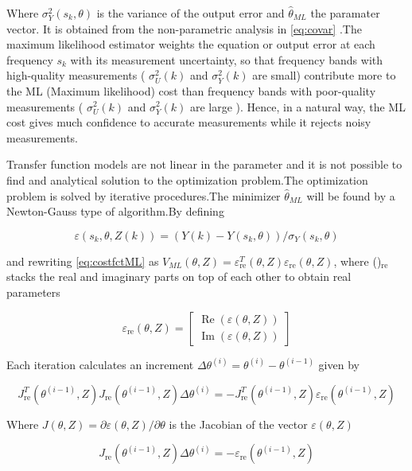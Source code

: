 \documentclass[a4paper,12pt]{article}
\numberwithin{equation}{section}
\begin{document}
\noindent
Where $\sigma_{Y}^{2}(s_{k}, \theta)$ is the variance of the output error and $\hat{\theta}_{ML}$ the paramater vector. It is obtained from the non-parametric analysis in \ref{eq:covar} .The maximum likelihood estimator weights the equation or output error at each frequency $s_{k}$ with its measurement uncertainty, so that frequency bands with high-quality
measurements ( $\sigma_{U}^{2}(k)$ and $\sigma_{Y}^{2}(k)$ are small) contribute more to the ML (Maximum likelihood) cost than frequency bands with poor-quality measurements ( $\sigma_{U}^{2}(k)$ and $\sigma_{Y}^{2}(k)$ are large ).  Hence, in a natural way, the ML cost gives much confidence to accurate measurements while it rejects noisy measurements.

Transfer function models are not linear in the parameter and it is not possible to find and analytical solution to the optimization problem.The optimization problem is solved by iterative procedures.The minimizer $\hat{\theta}_{ML}$ will be found by a Newton-Gauss type of algorithm.By defining 

$$
\varepsilon\left(s_{k}, \theta, Z(k)\right)=\left(Y(k)-Y\left(s_{k}, \theta\right)\right) / \sigma_{Y}\left(s_{k}, \theta\right)
$$

and rewriting \ref{eq:costfctML} as $V_{ML}(\theta, Z)=\varepsilon_{\mathrm{re}}^{T}(\theta, Z) \varepsilon_{\mathrm{re}}(\theta, Z)$, where ()$_{\mathrm{re}}$ stacks the real and imaginary
parts on top of each other to obtain real parameters

$$
\varepsilon_{\mathrm{re}}(\theta, Z)=\left[\begin{array}{l}
\operatorname{Re}(\varepsilon(\theta, Z)) \\
\operatorname{Im}(\varepsilon(\theta, Z))
\end{array}\right]
$$

Each iteration calculates an increment $\Delta \theta^{(i)}=\theta^{(i)}-\theta^{(i-1)}$ given by 

$$
J_{\mathrm{re}}^{T}\left(\theta^{(i-1)}, Z\right) J_{\mathrm{re}}\left(\theta^{(i-1)}, Z\right) \Delta \theta^{(i)}=-J_{\mathrm{re}}^{T}\left(\theta^{(i-1)}, Z\right) \varepsilon_{\mathrm{re}}\left(\theta^{(i-1)}, Z\right)
$$

Where $J(\theta, Z)=\partial \varepsilon(\theta, Z) / \partial \theta$ is the Jacobian of the vector $\varepsilon(\theta, Z)$

$$
J_{\mathrm{re}}\left(\theta^{(i-1)}, Z\right) \Delta \theta^{(i)}=-\varepsilon_{\mathrm{re}}\left(\theta^{(i-1)}, Z\right)
$$
\end{document}
